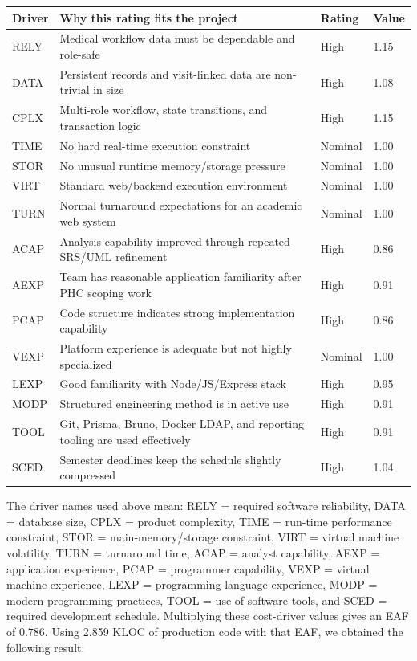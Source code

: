 \documentclass[11pt,a4paper]{article}
\begin{document}
\begin{center}
\begin{tabular}{|p{1.5cm}|p{4.9cm}|p{1.6cm}|p{1.3cm}|}
\hline
\rowcolor{SoftBlue}
\textbf{Driver} & \textbf{Why this rating fits the project} & \textbf{Rating} & \textbf{Value} \\
\hline
RELY & Medical workflow data must be dependable and role-safe & High & 1.15 \\
\hline
DATA & Persistent records and visit-linked data are non-trivial in size & High & 1.08 \\
\hline
CPLX & Multi-role workflow, state transitions, and transaction logic & High & 1.15 \\
\hline
TIME & No hard real-time execution constraint & Nominal & 1.00 \\
\hline
STOR & No unusual runtime memory/storage pressure & Nominal & 1.00 \\
\hline
VIRT & Standard web/backend execution environment & Nominal & 1.00 \\
\hline
TURN & Normal turnaround expectations for an academic web system & Nominal & 1.00 \\
\hline
ACAP & Analysis capability improved through repeated SRS/UML refinement & High & 0.86 \\
\hline
AEXP & Team has reasonable application familiarity after PHC scoping work & High & 0.91 \\
\hline
PCAP & Code structure indicates strong implementation capability & High & 0.86 \\
\hline
VEXP & Platform experience is adequate but not highly specialized & Nominal & 1.00 \\
\hline
LEXP & Good familiarity with Node/JS/Express stack & High & 0.95 \\
\hline
MODP & Structured engineering method is in active use & High & 0.91 \\
\hline
TOOL & Git, Prisma, Bruno, Docker LDAP, and reporting tooling are used effectively & High & 0.91 \\
\hline
SCED & Semester deadlines keep the schedule slightly compressed & High & 1.04 \\
\hline
\end{tabular}
\end{center}

The driver names used above mean: RELY = required software reliability, DATA = database size, CPLX = product complexity, TIME = run-time performance constraint, STOR = main-memory/storage constraint, VIRT = virtual machine volatility, TURN = turnaround time, ACAP = analyst capability, AEXP = application experience, PCAP = programmer capability, VEXP = virtual machine experience, LEXP = programming language experience, MODP = modern programming practices, TOOL = use of software tools, and SCED = required development schedule. Multiplying these cost-driver values gives an EAF of \(0.786\). Using 2.859 KLOC of production code with that EAF, we obtained the following result:
\end{document}
